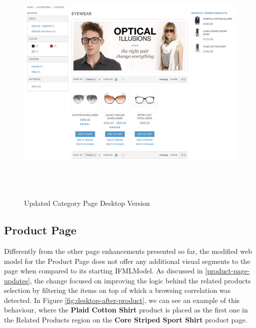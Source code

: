 \begin{figure}[H]
  \centering
    \includegraphics[height=12cm]{images/diagrams/after/desktop-category.png}
  \caption{Updated Category Page Desktop Version}
  \label{fig:desktop-after-category}
\end{figure}
\vspace{0.5cm}

\newpage
\subsection{Product Page}

Differently from the other page enhancements presented so far, the modified web model for the Product Page does not offer any additional visual segments to the page when compared to its starting IFMLModel. As discussed in \ref{product-page-updates}, the change focused on improving the logic behind the related products selection by filtering the items on top of which a browsing correlation was detected. In Figure \ref{fig:desktop-after-product}, we can see an example of this behaviour, where the \textbf{Plaid Cotton Shirt} product is placed as the first one in the Related Products region on the \textbf{Core Striped Sport Shirt} product page.

